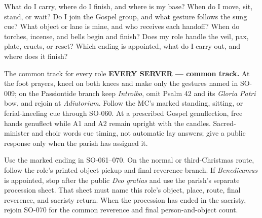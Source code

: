 \begin{samepage}
%
  {What do I carry, where do I finish, and where is my base?}
%
  {When do I move, sit, stand, or wait?}
%
  {Do I join the Gospel group, and what gesture follows the sung cue?}
%
  {What object or lane is mine, and who receives each handoff?}
%
  {When do torches, incense, and bells begin and finish?}
%
  {Does my role handle the veil, pax, plate, cruets, or reset?}
%
  {Which ending is appointed, what do I carry out, and where does it finish?}
\end{samepage}

\Needspace{0.34\textheight}
\label{solemn-common-track}
\begin{learnerbox}{The common track for every role}
\textbf{EVERY SERVER --- common track.}
At the foot prayers, kneel on both knees and make only the gestures named in
SO-009; on the Passiontide branch keep \emph{Introibo}, omit Psalm 42 and its
\emph{Gloria Patri} bow, and rejoin at \emph{Adiutorium}. Follow the MC's
marked standing, sitting, or ferial-kneeling cue through SO-060. At a prescribed
Gospel genuflection, free hands genuflect while A1 and A2 remain upright with
the candles. Sacred-minister and choir words cue timing, not automatic lay
answers; give a public response only when the parish has assigned it.

Use the marked ending in SO-061--070. On the normal or third-Christmas route,
follow the role's printed object pickup and final-reverence branch. If
\emph{Benedicamus} is appointed, stop after the public \emph{Deo gratias} and
use the parish's separate procession sheet. That sheet must name this role's
object, place, route, final reverence, and sacristy return. When the procession
has ended in the sacristy, rejoin SO-070 for the common reverence and final
person-and-object count.
\end{learnerbox}

\newcommand{\SolemnEveryRoleTrack}{%
\par\smallskip\noindent
\begingroup
\small
\noindent\colorbox{black!8}{%
  \parbox{\dimexpr\linewidth-2\fboxsep\relax}{%
    \textbf{EVERY SERVER --- common track:}
    use the complete posture, Gospel-gesture, response, ending, procession,
    and final-count directions on page~\pageref{solemn-common-track}.}}
\endgroup}

